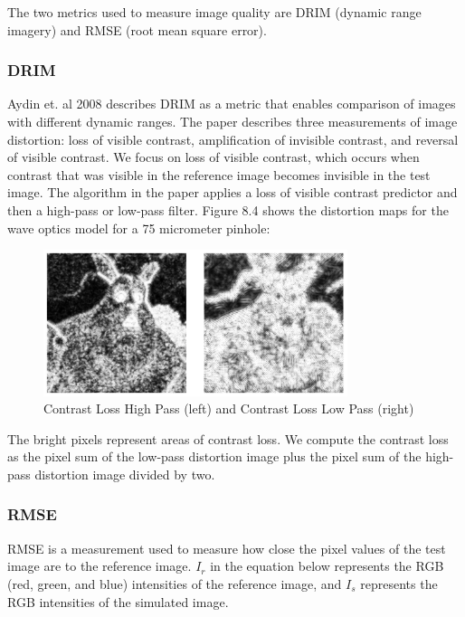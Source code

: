 The two metrics used to measure image quality are DRIM (dynamic range imagery) and RMSE (root mean square error).

\subsubsection{DRIM}

Aydin et. al 2008 \cite{aydin2008dynamic} describes DRIM as a metric that enables comparison of images with different dynamic ranges. The paper describes three measurements of image distortion: loss of visible contrast, amplification of invisible contrast, and reversal of visible contrast. We focus on loss of visible contrast, which occurs when contrast that was visible in the reference image becomes invisible in the test image. The algorithm in the paper applies a loss of visible contrast predictor and then a high-pass or low-pass filter. Figure 8.4 shows the distortion maps for the wave optics model for a 75 micrometer pinhole:

\begin{figure}[ht]
  \centering
  \includegraphics[width=3.5in]{chapters/chapter8/images/hp_lp_contrast_loss.png}
  \caption{Contrast Loss High Pass (left) and Contrast Loss Low Pass (right)}
  \label{fig:ferrari}
\end{figure}

The bright pixels represent areas of contrast loss. We compute the contrast loss as the pixel sum of the low-pass distortion image plus the pixel sum of the high-pass distortion image divided by two. 

\subsubsection{RMSE}

RMSE is a measurement used to measure how close the pixel values of the test image are to the reference image. $I_r$ in the equation below represents the RGB (red, green, and blue) intensities of the reference image, and $I_s$ represents the RGB intensities of the simulated image.

